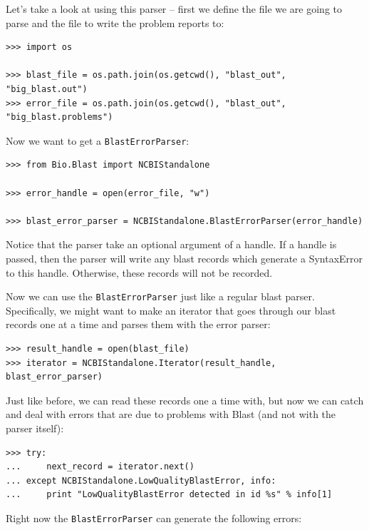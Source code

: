 \documentclass{report}
\begin{document}
Let's take a look at using this parser -- first we define the file we are going to parse and the file to write the problem reports to:

\begin{verbatim}
>>> import os
 
>>> blast_file = os.path.join(os.getcwd(), "blast_out", "big_blast.out")
>>> error_file = os.path.join(os.getcwd(), "blast_out", "big_blast.problems")
\end{verbatim}

Now we want to get a \verb|BlastErrorParser|:

\begin{verbatim}
>>> from Bio.Blast import NCBIStandalone

>>> error_handle = open(error_file, "w")

>>> blast_error_parser = NCBIStandalone.BlastErrorParser(error_handle)
\end{verbatim}

Notice that the parser take an optional argument of a handle. If a handle is passed, then the parser will write any blast records which generate a SyntaxError to this handle. Otherwise, these records will not be recorded.


Now we can use the \verb|BlastErrorParser| just like a regular blast parser. Specifically, we might want to make an iterator that goes through our blast records one at a time and parses them with the error parser:

\begin{verbatim}
>>> result_handle = open(blast_file)
>>> iterator = NCBIStandalone.Iterator(result_handle, blast_error_parser)
\end{verbatim}

Just like before, we can read these records one a time with, but now we can catch and deal with errors that are due to problems with Blast (and not with the parser itself):

\begin{verbatim}
>>> try:
...     next_record = iterator.next()
... except NCBIStandalone.LowQualityBlastError, info:
...     print "LowQualityBlastError detected in id %s" % info[1]
\end{verbatim}

Right now the \verb|BlastErrorParser| can generate the following errors:
\end{document}
